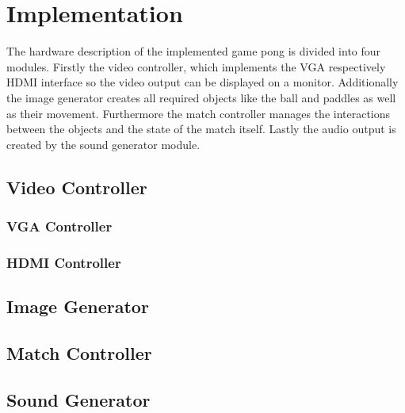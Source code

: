 \section{Implementation}
The hardware description of the implemented game pong is divided into four modules. Firstly the video controller, which implements the VGA respectively HDMI interface so the video output can be displayed on a monitor. Additionally the image generator creates all required objects like the ball and paddles as well as their movement. Furthermore the match controller manages the interactions between the objects and the state of the match itself. Lastly the audio output is created by the sound generator module.
	\subsection{Video Controller}
        \subsubsection{VGA Controller}
        \subsubsection{HDMI Controller}
    \subsection{Image Generator}
    \subsection{Match Controller}
    \subsection{Sound Generator}
